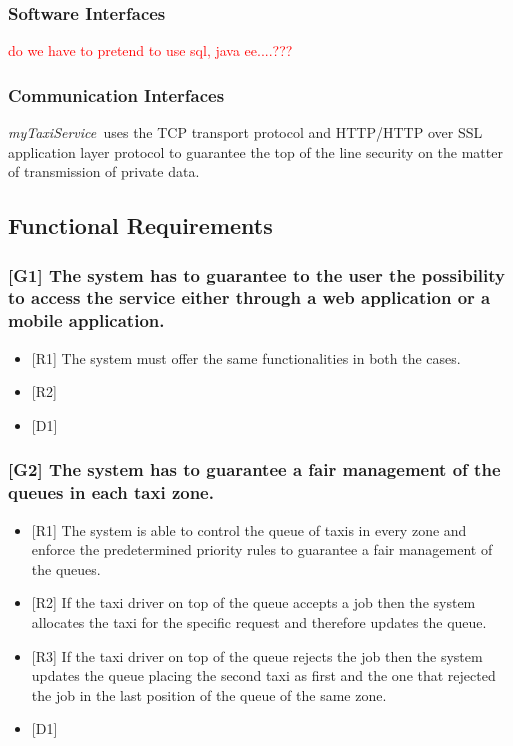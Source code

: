 \documentclass[a4paper,11pt]{report} %
\newcommand{\mts}{\mbox{\normalfont\itshape myTaxiService\ }}
\begin{document}
	\subsubsection{Software Interfaces} \textcolor{red}{do we have to pretend to use sql, java ee....???}
	
	\subsubsection{Communication Interfaces} \mts uses the TCP transport protocol and HTTP/HTTP over SSL application layer protocol to guarantee the top of the line security on the matter of transmission of private data.
	
	\subsection{Functional Requirements}
	
	\subsubsection{{[}G1{]} The system has to guarantee to the user the possibility to access the service either through a web application or a mobile application.}
	\begin{itemize}
		\item {[}R1{]} The system must offer the same functionalities in both the cases.
		\item {[}R2{]}
		\item {[}D1{]}
	\end{itemize}
	
	\subsubsection{{[}G2{]} The system has to guarantee a fair management of the queues in each taxi zone.}
	\begin{itemize}
		\item {[}R1{]} The system is able to control the queue of taxis in every zone and enforce the predetermined priority rules to guarantee a fair management of the queues.
		\item {[}R2{]} If the taxi driver on top of the queue accepts a job then the system allocates the taxi for the specific request and therefore updates the queue.
		\item {[}R3{]} If the taxi driver on top of the queue rejects the job then the system updates the queue placing the second taxi as first and the one that rejected the job in the last position of the queue of the same zone.
		\item {[}D1{]}
	\end{itemize}
		
\end{document}
